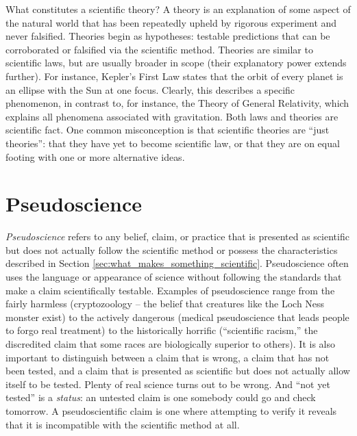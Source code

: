 \documentclass[11pt]{article}
\begin{document}
What constitutes a scientific theory? A theory is an explanation of some aspect of the natural world that has been repeatedly upheld by rigorous experiment and never falsified. Theories begin as hypotheses: testable predictions that can be corroborated or falsified via the scientific method. Theories are similar to scientific laws, but are usually broader in scope (their explanatory power extends further). For instance, Kepler's First Law states that the orbit of every planet is an ellipse with the Sun at one focus. Clearly, this describes a specific phenomenon, in contrast to, for instance, the Theory of General Relativity, which explains all phenomena associated with gravitation. Both laws and theories are scientific fact. One common misconception is that scientific theories are ``just theories'': that they have yet to become scientific law, or that they are on equal footing with one or more alternative ideas.

\section{Pseudoscience}
\textit{Pseudoscience} refers to any belief, claim, or practice that is
presented as scientific but does not actually follow the scientific method
or possess the characteristics described in Section \ref{sec:what_makes_something_scientific}. Pseudoscience often uses the language or
appearance of science without following the standards that make a claim
scientifically testable. Examples of pseudoscience range from the fairly harmless
(cryptozoology -- the belief that creatures like the Loch Ness monster
exist) to the actively dangerous (medical pseudoscience that leads people to
forgo real treatment) to the historically horrific (``scientific racism,''
the discredited claim that some races are biologically superior to others).
It is also important to distinguish between a claim that is wrong, a claim that has not been tested, and a claim that is presented as scientific but does not actually allow itself to be tested. Plenty of real science turns out to be wrong. And ``not yet tested'' is
a \emph{status}: an untested claim is one somebody
could go and check tomorrow. A pseudoscientific claim is one where attempting to verify it reveals that it is incompatible with the scientific method at all.

\end{document}
